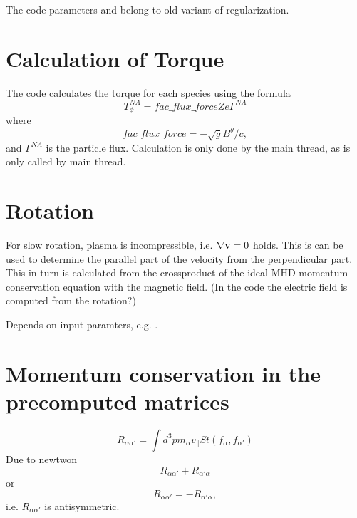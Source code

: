 The code parameters  and
 belong to old variant of
regularization.

\section{Calculation of Torque}
The code calculates the torque for each species using the formula
\begin{equation}
       T_{\phi}^{NA} = fac\_flux\_force Z e \Gamma^{NA}
\end{equation}
where
\begin{equation}
  fac\_flux\_force = -\sqrt{g} B^{\theta} / c,
\end{equation}
and $\Gamma^{NA}$ is the particle flux.
Calculation is only done by the main thread, as
 is only called by main
thread.

\section{Rotation}

For slow rotation, plasma is incompressible, i.e. $\nabla {\bf v} = 0$
holds. This is can be used to determine the parallel part of the
velocity from the perpendicular part. This in turn is calculated from
the crossproduct of the ideal MHD momentum conservation equation with
the magnetic field.
(In the code the electric field is computed from the rotation?)

Depends on input paramters, e.g. .

\section{Momentum conservation in the precomputed matrices}
\begin{equation}
  R_{\alpha\alpha'} = \int d^3p m_{\alpha} v_{\parallel} St(f_{\alpha}, f_{\alpha'})
\end{equation}
Due to newtwon
\begin{equation}
  R_{\alpha\alpha'} + R_{\alpha'\alpha}
\end{equation}
or
\begin{equation}
  R_{\alpha\alpha'} = - R_{\alpha'\alpha},
\end{equation}
i.e. $R_{\alpha\alpha'}$ is antisymmetric.

